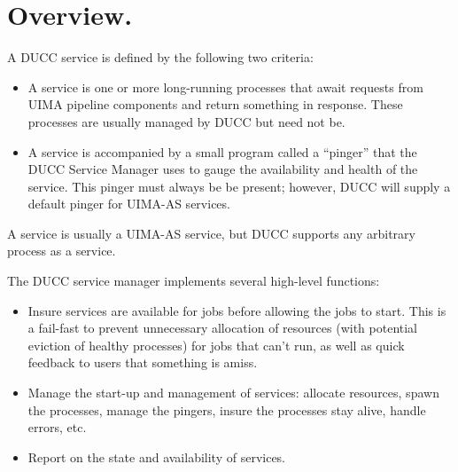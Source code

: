% 
% 
% 
% 

      \section{Overview.} 
      A DUCC service is defined by the following two criteria:
      \begin{itemize}
          \item A service is one or more long-running processes that await requests from
            UIMA pipeline components and return something in response.  These processes
            are usually managed by DUCC but need not be.
          \item A service is accompanied by a small program called a ``pinger'' that
            the DUCC Service Manager uses to gauge the availability and health of the
            service.  This pinger must always be be present; however, DUCC will
            supply a default pinger for UIMA-AS services.
      \end{itemize}

      A service is usually a UIMA-AS service, but DUCC supports any arbitrary process
      as a service.

      The DUCC service manager implements several high-level functions:
      
      \begin{itemize}
          \item Insure services are available for jobs before allowing the jobs to start. This is a fail-fast
            to prevent unnecessary allocation of resources (with potential eviction of healthy processes)
            for jobs that can't run, as well as quick feedback to users that something is amiss.
      
          \item Manage the start-up and management of services: allocate resources, spawn the
            processes, manage the pingers, insure the processes stay alive, handle errors, etc.
      
          \item Report on the state and availability of services.
       \end{itemize}


